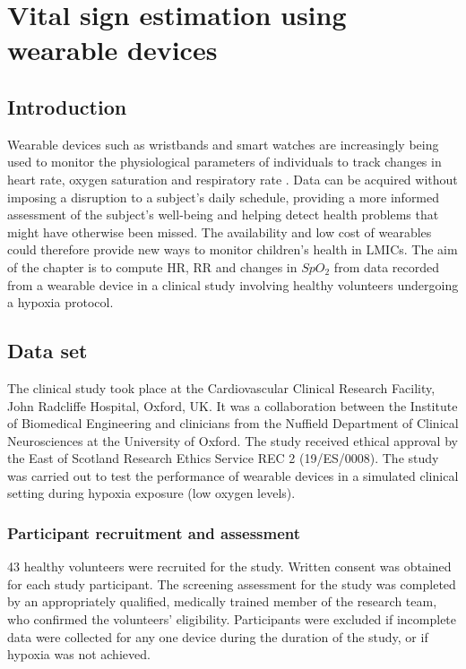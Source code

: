 \chapter{Vital sign estimation using wearable devices}

\label{chapter:PPG signal Processing} 

\section{Introduction}

Wearable devices such as wristbands and smart watches are increasingly being used to monitor the physiological parameters of individuals to track changes in heart rate, oxygen saturation and respiratory rate \cite{castaneda2018review}. Data can be acquired without imposing a disruption to a subject's daily schedule, providing a more informed assessment of the subject's well-being and helping detect health problems that might have otherwise been missed. The availability and low cost of wearables could therefore provide new ways to monitor children's health in LMICs. The aim of the chapter is to compute HR, RR and changes in $SpO_{2}$ from data recorded from a wearable device in a clinical study involving healthy volunteers undergoing a hypoxia protocol. 


\section{Data set}

The clinical study took place at the Cardiovascular Clinical Research Facility, John Radcliffe Hospital, Oxford, UK. It was a collaboration between the Institute of Biomedical Engineering and clinicians from the Nuffield Department of Clinical Neurosciences at the University of Oxford. The study received ethical approval by the East of Scotland Research Ethics Service REC 2 (19/ES/0008). The study was carried out to test the performance of wearable devices in a simulated clinical setting during hypoxia exposure (low oxygen levels).  

\subsection{Participant recruitment and assessment}

43 healthy volunteers were recruited for the study. Written consent was obtained for each study participant. The screening assessment for the study was completed by an appropriately qualified, medically trained member of the research team, who confirmed the volunteers' eligibility. Participants were excluded if incomplete data were collected for any one device during the duration of the study, or if hypoxia was not achieved.

